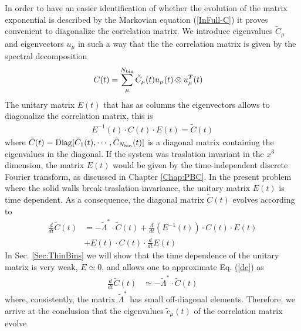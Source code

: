 \documentclass[a4paper,openright,12pt]{book}
\newcommand{\esc}{\!\cdot\!}
\begin{document}
In order to have an easier  identification of whether the evolution of
the  matrix  exponential  is   described  by  the  Markovian  equation
(\ref{InFull-C}) it  proves convenient to diagonalize  the correlation
matrix.   We introduce  eigenvalues  $\tilde{C}_\mu$ and  eigenvectors
$u_\mu$ in such a way that the  the correlation matrix is given by the
spectral decomposition
\begin{align}
  C(t)&=\sum_\mu^{N_{\rm bin}}\tilde{C}_\mu(t) u_\mu(t) \otimes u_\mu^T(t)
\label{spectral}
\end{align}
The unitary matrix $E(t)$ that  has as columns the eigenvectors allows
to diagonalize the correlation matrix, this is
\begin{align}
  E^{-1}(t)\esc C(t)\esc E(t)=\tilde{C}(t)
\label{diag}
\end{align}
where $\tilde{C}(t)={\rm Diag}[\tilde{C}_1(t),\cdots,\tilde{C}_{N_{\rm
    bin}}(t)]$ is a diagonal matrix  containing the eigenvalues in the
diagonal.   If  the  system  was traslation  invariant  in  the  $x^3$
dimension, the  matrix $E(t)$ would  be given by  the time-independent
discrete Fourier  transform, as discussed  in Chapter  \ref{Chap:PBC}.   In the
present problem where the solid walls break traslation invariance, the
unitary  matrix  $E(t)$ is  time  dependent.   As a  consequence,  the
diagonal matrix $\tilde{C}(t)$ evolves according to
\begin{align}
\frac{d}{dt}  \tilde{C}(t)&=-\tilde{\Lambda}^*\esc \tilde{C}(t)
  +\frac{d }{dt}(E^{-1}(t)) \esc C(t)\esc E(t)\nonumber\\
  &+E(t)\esc C(t)\esc \frac{d }{dt}E(t)  
\label{dc}
\end{align}
In Sec. \ref{Sec:ThinBins} we will show that the time dependence of the unitary  matrix is
very weak, $\dot{E}\simeq 0$, and allows one to approximate Eq. (\ref{dc}) as
\begin{align}
\frac{d}{dt}  \tilde{C}(t)&\simeq-\tilde{\Lambda}^*\esc \tilde{C}(t)
\label{Ctilde}
\end{align}
where,   consistently,  the   matrix  $\tilde{\Lambda}^*$   has  small
off-diagonal elements.   Therefore, we  arrive at the  conclusion that
the eigenvalues  $\tilde{c}_\mu(t)$ of  the correlation  matrix evolve
\end{document}
